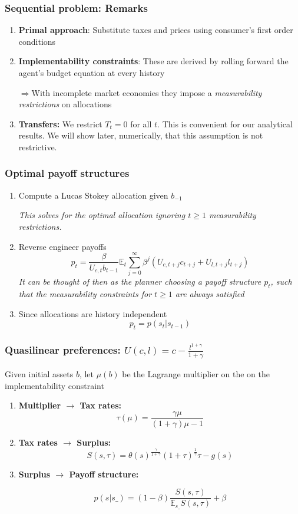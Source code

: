 \documentclass{beamer}
\newcommand{\EE}{\mathbb E}
\begin{document}
  \begin{frame}
  \frametitle{Sequential problem: Remarks}
  \begin{enumerate}
  \item \textbf{Primal approach}: Substitute taxes and prices using consumer's first order conditions
  \item \textbf{Implementability constraints}:  These are derived by rolling forward the agent's budget equation at every history
  
  $\Rightarrow$With incomplete market economies they impose a \emph{measurability restrictions} on allocations
  
  \item  \textbf{Transfers: } We restrict $T_t = 0$ for all $t$. This is convenient for our analytical results.  We will show later, numerically, that this assumption is not restrictive.
  
  \end{enumerate}

 
  \end{frame}

 \begin{frame}
\frametitle{Optimal payoff structures}
\begin{enumerate}
 \item Compute a Lucas Stokey allocation given $b_{-1}$
 
 \emph{ This solves for the optimal allocation ignoring $t\geq1$ measurability restrictions.}

 \item Reverse engineer payoffs
\[
	p_t = \frac{\beta}{U_{c,t}b_{t-1}}\EE_t\sum_{j=0}^\infty\beta^j\left(U_{c,t+j}c_{t+j}+U_{l,t+j}l_{t+j}\right)
\]
\emph{ It can be thought of then as the planner choosing a payoff structure $p_t$, such that the measurability constraints for $t\geq 1$ are always satisfied}
\item Since allocations are history independent 
\[p_t=p(s_t|s_{t-1})\]
\end{enumerate}
\end{frame}

\begin{frame}
\frametitle{Quasilinear preferences: $U(c,l)=c-\frac{l^{1+\gamma}}{1+\gamma}$}
Given initial assets $b$,  let $\mu(b)$ be the Lagrange multiplier on the on the implementability constraint
\begin{enumerate}
 
 \item \textbf{Multiplier $\to$ Tax rates:}
 \[
		\tau(\mu) = \frac{\gamma\mu}{(1+\gamma)\mu-1}
	\]
 \item \textbf{Tax rates $\to$ Surplus:} 
 \[
		S(s,\tau) = \theta(s)^\frac\gamma{1+\gamma}(1+\tau)^\frac1\gamma\tau-g(s)
	\]
\item \textbf{Surplus $\to$ Payoff structure:} 

\[
 p(s|s\_) = (1-\beta)\frac{S(s,\tau)}{\EE_{s\_} S(s,\tau)} + \beta
 \]

 \end{enumerate}

\end{frame} 
\end{document}
